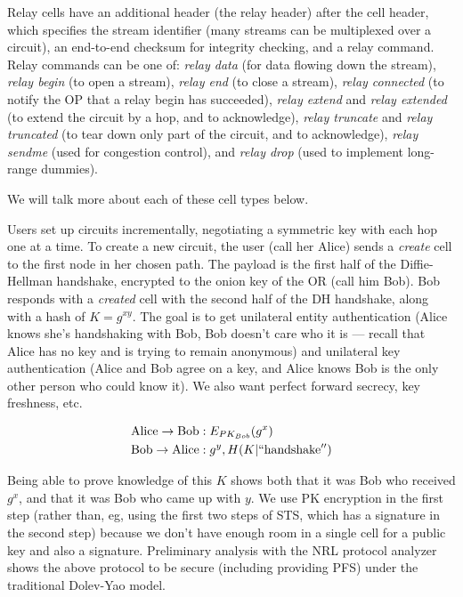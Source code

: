 \documentclass[times,10pt,twocolumn]{article}
\begin{document}
Relay cells have an additional header (the relay header) after the
cell header, which specifies the stream identifier (many streams can
be multiplexed over a circuit), an end-to-end checksum for integrity
checking, and a relay command. Relay commands can be one of: \emph{relay
data} (for data flowing down the stream), \emph{relay begin} (to open a
stream), \emph{relay end} (to close a stream), \emph{relay connected}
(to notify the OP that a relay begin has succeeded), \emph{relay
extend} and \emph{relay extended} (to extend the circuit by a hop,
and to acknowledge), \emph{relay truncate} and \emph{relay truncated}
(to tear down only part of the circuit, and to acknowledge), \emph{relay
sendme} (used for congestion control), and \emph{relay drop} (used to
implement long-range dummies).

We will talk more about each of these cell types below.


\label{subsec:circuits}

Users set up circuits incrementally, negotiating a symmetric key with
each hop one at a time. To create a new circuit, the user (call her
Alice) sends a \emph{create} cell to the first node in her chosen
path. The payload is the first half of the Diffie-Hellman handshake,
encrypted to the onion key of the OR (call him Bob). Bob responds with a
\emph{created} cell with the second half of the DH handshake, along with
a hash of $K=g^{xy}$. The goal is to get unilateral entity authentication
(Alice knows she's handshaking with Bob, Bob doesn't care who it is ---
recall that Alice has no key and is trying to remain anonymous) and
unilateral key authentication (Alice and Bob agree on a key, and Alice
knows Bob is the only other person who could know it). We also want
perfect forward secrecy, key freshness, etc.

\begin{equation}
\begin{aligned}
\mathrm{Alice} \rightarrow \mathrm{Bob}&: E_{PK_{Bob}}(g^x) \\
\mathrm{Bob} \rightarrow \mathrm{Alice}&: g^y, H(K | \mathrm{``handshake''}) \\
\end{aligned}
\end{equation}

Being able to prove knowledge of this $K$ shows both that it was Bob
who received $g^x$, and that it was Bob who came up with $y$. We use
PK encryption in the first step (rather than, eg, using the first two
steps of STS, which has a signature in the second step) because we
don't have enough room in a single cell for a public key and also a
signature. Preliminary analysis with the NRL protocol analyzer shows
the above protocol to be secure (including providing PFS) under the
traditional Dolev-Yao model.
\end{document}
